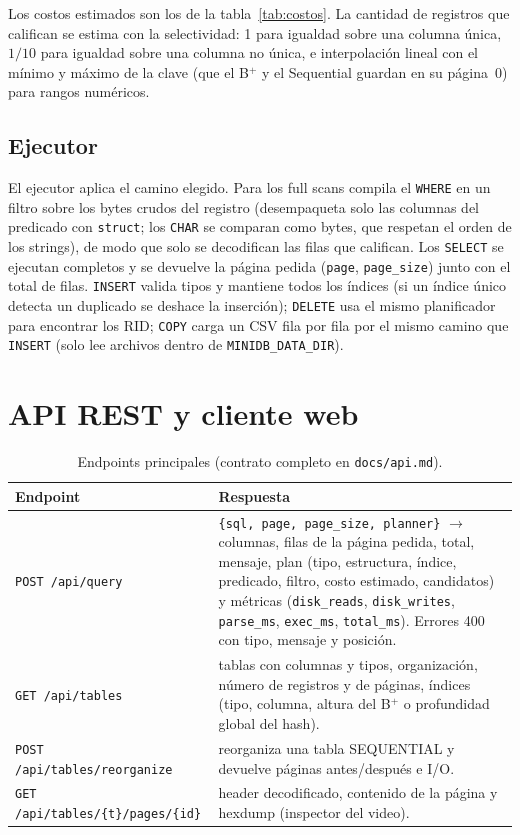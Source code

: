 \documentclass[11pt,a4paper]{article}
\newcommand{\code}[1]{\texttt{#1}}
\begin{document}
Los costos estimados son los de la tabla~\ref{tab:costos}. La cantidad de registros que califican se
estima con la selectividad: 1 para igualdad sobre una columna única, $1/10$ para igualdad sobre una
columna no única, e interpolación lineal con el mínimo y máximo de la clave (que el B$^+$ y el
Sequential guardan en su página~0) para rangos numéricos.

\subsection{Ejecutor}

El ejecutor aplica el camino elegido. Para los full scans compila el \code{WHERE} en un filtro sobre
los bytes crudos del registro (desempaqueta solo las columnas del predicado con \code{struct}; los
\code{CHAR} se comparan como bytes, que respetan el orden de los strings), de modo que solo se
decodifican las filas que califican. Los \code{SELECT} se ejecutan completos y se devuelve la página
pedida (\code{page}, \code{page\_size}) junto con el total de filas. \code{INSERT} valida tipos y
mantiene todos los índices (si un índice único detecta un duplicado se deshace la inserción);
\code{DELETE} usa el mismo planificador para encontrar los RID; \code{COPY} carga un CSV fila por
fila por el mismo camino que \code{INSERT} (solo lee archivos dentro de \code{MINIDB\_DATA\_DIR}).

\section{API REST y cliente web}

\begin{table}[H]
\centering\small
\begin{tabularx}{\textwidth}{@{}lX@{}}
\toprule
Endpoint & Respuesta \\
\midrule
\code{POST /api/query} & \code{\{sql, page, page\_size, planner\}} $\to$ columnas, filas de la página pedida, total, mensaje, plan (tipo, estructura, índice, predicado, filtro, costo estimado, candidatos) y métricas (\code{disk\_reads}, \code{disk\_writes}, \code{parse\_ms}, \code{exec\_ms}, \code{total\_ms}). Errores 400 con tipo, mensaje y posición. \\
\code{GET /api/tables} & tablas con columnas y tipos, organización, número de registros y de páginas, índices (tipo, columna, altura del B$^+$ o profundidad global del hash). \\
\code{POST /api/tables/reorganize} & reorganiza una tabla SEQUENTIAL y devuelve páginas antes/después e I/O. \\
\code{GET /api/tables/\{t\}/pages/\{id\}} & header decodificado, contenido de la página y hexdump (inspector del video). \\
\bottomrule
\end{tabularx}
\caption{Endpoints principales (contrato completo en \code{docs/api.md}).}
\end{table}
\end{document}
